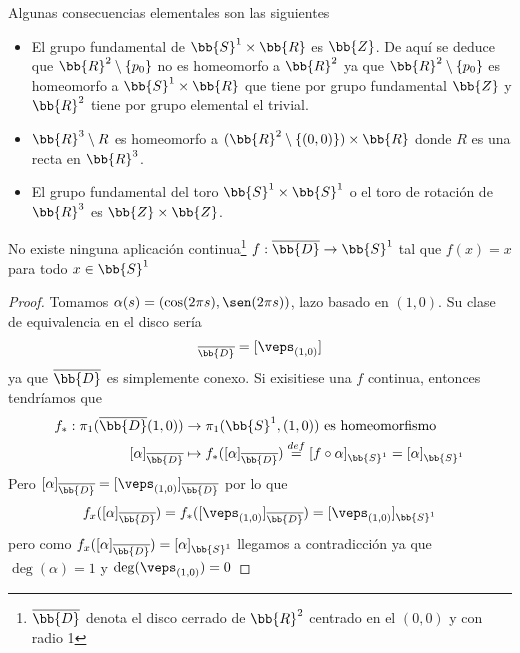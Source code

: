 \begin{observacion}
    Algunas consecuencias elementales son las siguientes
    \begin{itemize}
        \item El grupo fundamental de $\bb{S}^1\times \bb{R}$ es $\bb{Z}$. De aquí se deduce que $\bb{R}^2 \setminus \{p_0\}$ no es homeomorfo a $\bb{R}^2$ ya que $\bb{R}^2 \setminus \{p_0\}$ es homeomorfo a $\bb{S}^1\times \bb{R}$ que tiene por grupo fundamental $\bb{Z}$ y $\bb{R}^2$ tiene por grupo elemental el trivial.
        
        \item $\bb{R}^3\setminus R$ es homeomorfo a $(\bb{R}^2 \setminus \{(0,0)\}) \times \bb{R}$ donde $R$ es una recta en $\bb{R}^3$.
        
        \item El grupo fundamental del toro $\bb{S}^1 \times \bb{S}^1$ o el toro de rotación de $\bb{R}^3$ es $\bb{Z}\times \bb{Z}$.
    \end{itemize}
\end{observacion}

\begin{prop}\label{prop1-12}
    No existe ninguna aplicación continua\footnote{$\overline{\bb{D}}$ denota el disco cerrado de $\bb{R}^2$ centrado en el $(0,0)$ y con radio 1} $f : \overline{\bb{D}} \to \bb{S}^1$ tal que $f(x) = x$ para todo $x\in \bb{S}^1$

    \begin{proof}
        Tomamos $\alpha (s) = (\cos(2\pi s), \sen(2\pi s))$, lazo basado en $(1,0)$. Su clase de equivalencia en el disco sería 
        \begin{gather*}
            [\alpha]_{\overline{\bb{D}}} = [\veps_{(1,0)}]
        \end{gather*}
        ya que $\overline{\bb{D}}$ es simplemente conexo. Si exisitiese una $f$ continua, entonces tendríamos que
        \begin{align*}
            f_*:\pi_1(\overline{\bb{D}}(1,0)) & \to \pi_1(\bb{S}^1, (1,0))\text{ es homeomorfismo}\\
            [\alpha]_{\overline{\bb{D}}} & \mapsto f_*([\alpha]_{\overline{\bb{D}}}) \overset{def}{=}[f\circ \alpha]_{\bb{S}^1} = [\alpha]_{\bb{S}^1}
        \end{align*}
        Pero $[\alpha]_{\overline{\bb{D}}} = [\veps_{(1,0)}]_{\overline{\bb{D}}}$ por lo que 
        \begin{gather*}
            f_x([\alpha]_{\overline{\bb{D}}}) = f_*([\veps_{(1,0)}]_{\overline{\bb{D}}}) = [\veps_{(1,0)}]_{\bb{S}^1}
        \end{gather*}
        pero como $f_x([\alpha]_{\overline{\bb{D}}}) = [\alpha]_{\bb{S}^1}$ llegamos a contradicción ya que $\deg(\alpha) = 1$ y $\deg(\veps_{(1,0)}) = 0$
    \end{proof}
\end{prop}

